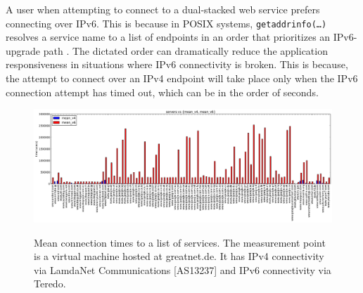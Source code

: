 A user when attempting to connect to a dual-stacked web service prefers
connecting over IPv6. This is because in POSIX systems,
\texttt{getaddrinfo(\ldots)} resolves a service name to a list of endpoints in
an order that prioritizes an IPv6-upgrade path \cite{rfc6724}.  The dictated
order can dramatically reduce the application responsiveness in situations
where IPv6 connectivity is broken. This is because, the attempt to connect
over an IPv4 endpoint will take place only when the IPv6 connection attempt
has timed out, which can be in the order of seconds.

\begin{figure}[t]
\centering
\includegraphics[width=1.0\textwidth]{figures/t28972-mean}
\label{fig:t28972-mean}
\caption{Mean connection times to a list of services. The measurement point is
a virtual machine hosted at greatnet.de. It has IPv4 connectivity via LamdaNet
Communications [AS13237] and IPv6 connectivity via Teredo.}
\end{figure}



